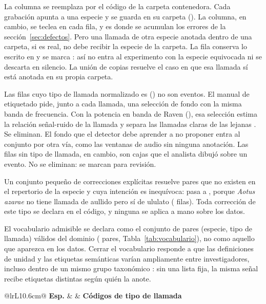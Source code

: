 \label{sec:regla-especie}
La columna  se reemplaza por el código de la carpeta contenedora.
Cada grabación apunta a una especie y se guarda en su carpeta (\cpEquipo). La
columna, en cambio, se teclea en cada fila, y es donde se acumulan los errores de
la sección~\ref{sec:defectos}. Pero una llamada de otra especie anotada dentro de
una carpeta, si es real, no debe recibir la especie de la carpeta. La fila
conserva lo escrito en  y se marca :
así no entra al experimento con la especie equivocada ni se descarta en silencio.
La unión de copias resuelve el caso en que esa llamada sí está anotada en su
propia carpeta.

 Las filas cuyo tipo de llamada normalizado es
 (\nNoise{}) no son eventos. El manual de etiquetado pide, junto a
cada llamada, una selección de fondo con la misma banda de frecuencia. Con la
potencia en banda de Raven (), esa selección estima la relación
señal-ruido de la llamada y separa las llamadas claras de las lejanas
\citep{proyecto8_manual_2025}. Se eliminan. El fondo que el detector debe aprender
a no proponer entra al conjunto por otra vía, como las ventanas de audio sin
ninguna anotación. Las \nEmptyCall{} filas sin tipo de llamada, en cambio, son
cajas que el analista dibujó sobre un evento. No se eliminan: se marcan para
revisión.

 Un conjunto pequeño de correcciones
explícitas resuelve pares que no existen en el repertorio de la especie y cuya
intención es inequívoca:  pasa a , porque
\textit{Aotus azarae} no tiene llamada de aullido pero sí de ululato
(\nFixed{} filas). Toda corrección de este tipo se declara en el
código, y ninguna se aplica a mano sobre los datos.

 El vocabulario admisible se
declara como el conjunto de pares (especie, tipo de llamada) válidos del dominio
(\nVocab{} pares, Tabla~\ref{tab:vocabulario}), no como aquello que aparezca en
los datos. Cerrar el vocabulario responde a que las definiciones de unidad y las
etiquetas semánticas varían ampliamente entre investigadores, incluso dentro de
un mismo grupo taxonómico \citep{kershenbaum_acoustic_2016}: sin una lista fija,
la misma señal recibe etiquetas distintas según quién la anote.

\begin{table}[htbp]
    \centering
    \caption{Vocabulario cerrado}
    \label{tab:vocabulario}
    \small
    \begin{tabular}{@{}lrL{10.6cm}@{}}
        \toprule
        \textbf{Esp.} &  & \textbf{Códigos de tipo de llamada} \\
        \midrule
         \\
        \bottomrule
    \end{tabular}
\end{table}


